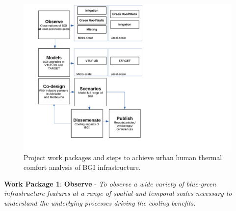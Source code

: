 \begin{figure}
\begin{center}
\includegraphics[scale=0.6,trim=40 50 350 0,clip]{Processes.pdf}
\end{center}
\caption{Project work packages and steps to achieve urban human thermal comfort analysis of BGI infrastructure.}
\label{fig:overall}
\end{figure}


\textbf{Work Package 1}: \textbf{Observe} - \emph{To observe a wide variety of blue-green infrastructure features at a range of spatial and temporal scales necessary to understand the underlying processes driving the cooling benefits.}

